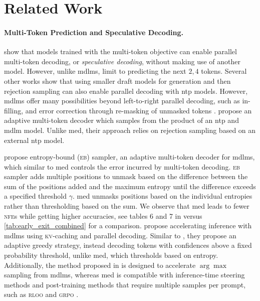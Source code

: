    

\section{Related Work}
\paragraph{Multi-Token Prediction and Speculative Decoding.}
\citet{gloeckle2024better} show that models trained with the multi-token objective can enable parallel multi-token decoding, or \textit{speculative decoding}, without making use of another model. However, unlike \glspl{mdlm}, \citet{gloeckle2024better} limit to predicting the next $2, 4$ tokens. Several other works \citep{leviathan2023fast,chen2023accelerating} show that using smaller draft models for generation and then rejection sampling can also enable parallel decoding with \gls{ntp} models. However, \glspl{mdlm} offer many possibilities beyond left-to-right parallel decoding, such as in-filling, and error correction through re-masking of unmasked tokens \citep{wang2025remasking}. \citet{israel2025accelerating} propose an adaptive multi-token decoder which samples from the product of an \gls{ntp} and \gls{mdlm} model. Unlike \gls{med}, their approach relies on rejection sampling based on an external \gls{ntp} model. 


\citet{ben2025accelerated} propose entropy-bound (\textsc{eb}) sampler, an adaptive multi-token decoder for \glspl{mdlm}, which similar to \gls{med} controls the error incurred by multi-token decoding. \textsc{eb} sampler adds multiple positions to unmask based on the difference between the sum of the positions added and the maximum entropy until the difference exceeds a specified threshold $\gamma$. \gls{med} unmasks positions based on the individual entropies rather than thresholding based on the sum. We observe that \gls{med} leads to fewer \textsc{nfe}s while getting higher accuracies, see tables 6 and 7 in \citet{ben2025accelerated} versus \cref{tab:early_exit_combined} for a comparison. \citet{wu2025fast} propose accelerating inference with \glspl{mdlm} using \textsc{kv}-caching and parallel decoding. 
Similar to \citet{ben2025accelerated}, they propose an adaptive greedy strategy, instead decoding tokens with confidences above a fixed probability threshold, unlike \gls{med}, which thresholds based on entropy. Additionally, the method proposed in \citet{wu2025fast} is designed to accelerate $\arg \max$ sampling from \glspl{mdlm}, whereas \gls{med} is compatible with inference-time steering methods and post-training methods that require multiple samples per prompt, such as  \textsc{rloo} \citep{ahmadian2024back} and  \textsc{grpo} \citep{shao2024deepseekmath,zhao2025d1scalingreasoningdiffusion}.

